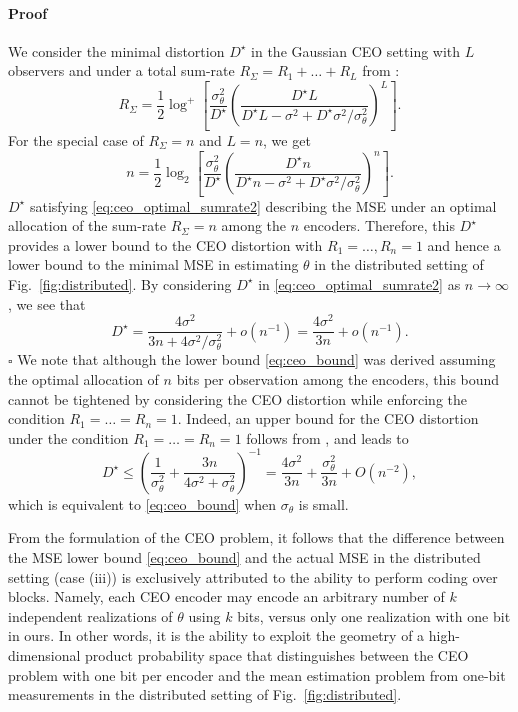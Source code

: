 \documentclass[letterpaper, 11pt]{IEEEtran}      %
\newenvironment{proof}{\paragraph*{Proof}}{\hfill$\square$ \newline}
\begin{document}
\begin{proof}
We consider the minimal distortion $D^\star$ in the Gaussian CEO setting with $L$ observers and under a total sum-rate $R_\Sigma = R_1 + \ldots +R_L$
from \cite[Eq. 10]{chen2004upper}:
\begin{equation} \label{eq:ceo_optimal_sumrate}
R_{\Sigma} = \frac{1}{2} \log^+ \left[ \frac{\sigma_\theta^2}{D^\star} \left( \frac{D^\star L}{ D^\star L - \sigma^2 + D^\star \sigma^2 / \sigma_\theta^2 }\right)^L  \right].
\end{equation}
For the special case of $R_\Sigma = n$ and $L=n$, we get
\begin{equation} \label{eq:ceo_optimal_sumrate2}
n = \frac{1}{2} \log_2 \left[ \frac{\sigma_\theta^2}{D^\star} \left(\frac{ D^\star n }{D^\star n - \sigma^2 + D^\star \sigma^2/\sigma_\theta^2 }  \right)^n  \right].
\end{equation}
$D^\star$ satisfying \eqref{eq:ceo_optimal_sumrate2} describing the MSE under an optimal allocation of the sum-rate $R_\Sigma = n$ among the $n$ encoders. Therefore, this $D^\star$ provides a lower bound to the CEO distortion with $R_1=\ldots,R_n = 1$ and hence a lower bound to the minimal MSE in estimating $\theta$ in the distributed setting of Fig.~\ref{fig:distributed}. By considering $D^\star$ in \eqref{eq:ceo_optimal_sumrate2} as $n\rightarrow \infty$, we see that 
\[
D^\star = \frac{ 4\sigma^2 }{3n + 4 \sigma^2 / \sigma_\theta^2 } + o(n^{-1}) =  \frac{4\sigma^2}{3n} + o(n^{-1}). 
\]
\end{proof}
We note that although the lower bound \eqref{eq:ceo_bound} was derived assuming the optimal allocation of $n$ bits per observation among the encoders, this bound cannot be tightened by considering the CEO distortion while enforcing the condition $R_1=\ldots = R_n = 1$. Indeed, an upper bound for the CEO distortion under the condition $R_1=\ldots = R_n = 1$ follows from \cite{KipnisRini2017}, and leads to
\[
D^\star \leq  \left( \frac{1}{\sigma_\theta^2} +  \frac{3n}{4\sigma^2 + \sigma_\theta^2} \right)^{-1}   =
\frac{4 \sigma^2}{3n} +  \frac{\sigma_\theta^2}{3n} + O(n^{-2}),
\]
which is equivalent to \eqref{eq:ceo_bound} when $\sigma_\theta$ is small. \par
From the formulation of the CEO problem, it follows that the difference between the MSE lower bound \eqref{eq:ceo_bound} and the actual MSE in the distributed setting (case (iii)) is exclusively attributed  to the ability to perform coding over blocks. Namely, each CEO encoder may encode an arbitrary number of $k$ independent realizations of $\theta$ using $k$ bits, versus only one realization with one bit in ours. In other words, it is the ability to exploit the geometry of a high-dimensional product probability space that 
distinguishes between the CEO problem with one bit per encoder and the mean estimation problem from one-bit measurements in the distributed setting of Fig.~\ref{fig:distributed}. 
\end{document}
